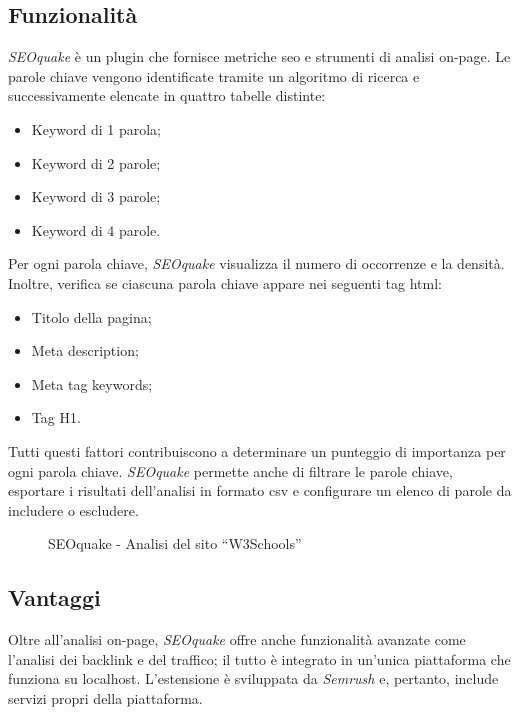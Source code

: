 \subsection{Funzionalità}
\par \textit{SEOquake} è un plugin che fornisce metriche \gls{seo} e strumenti di analisi \gls{on-page}. Le parole chiave vengono identificate tramite un algoritmo di ricerca e successivamente elencate in quattro tabelle distinte:
\begin{itemize}
    \item Keyword di 1 parola;
    \item Keyword di 2 parole;
    \item Keyword di 3 parole;
    \item Keyword di 4 parole.
\end{itemize}
\vspace{5pt}
\par\noindent Per ogni parola chiave, \textit{SEOquake} visualizza il numero di occorrenze e la densità. Inoltre, verifica se ciascuna parola chiave appare nei seguenti tag \gls{html}:
\begin{itemize}
    \item Titolo della pagina;
    \item Meta description;
    \item Meta tag keywords;
    \item Tag H1.
\end{itemize}
\vspace{5pt}
\par\noindent Tutti questi fattori contribuiscono a determinare un punteggio di importanza per ogni parola chiave. \textit{SEOquake} permette anche di filtrare le parole chiave, esportare i risultati dell'analisi in formato \gls{csv} e configurare un elenco di parole da includere o escludere.

\begin{figure}[H]
    \centering 
    \caption{SEOquake - Analisi del sito “W3Schools”}
\end{figure}

\subsection{Vantaggi}
\par Oltre all'analisi \gls{on-page}, \textit{SEOquake} offre anche funzionalità avanzate come l'analisi dei \gls{backlink} e del traffico; il tutto è integrato in un'unica piattaforma che funziona su \gls{localhost}. L'estensione è sviluppata da \textit{Semrush} e, pertanto, include servizi propri della piattaforma.

